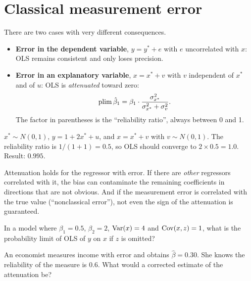 \section{Classical measurement error}
There are two cases with very different consequences.
\begin{itemize}[leftmargin=1.4em]
\item \textbf{Error in the dependent variable}, $y=y^*+e$ with $e$ uncorrelated with $x$: OLS remains consistent and only loses precision.
\item \textbf{Error in an explanatory variable}, $x=x^*+v$ with $v$ independent of $x^*$ and of $u$: OLS is \emph{attenuated} toward zero:
\[
\operatorname{plim}\hat\beta_1=\beta_1\cdot\frac{\sigma^2_{x^*}}{\sigma^2_{x^*}+\sigma^2_v}.
\]
The factor in parentheses is the ``reliability ratio'', always between 0 and 1.
\end{itemize}

\begin{simulacao}
$x^*\sim N(0,1)$, $y=1+2x^*+u$, and $x=x^*+v$ with $v\sim N(0,1)$. The reliability ratio is $1/(1+1)=0.5$, so OLS should converge to $2\times0.5=1.0$. Result: $0.995$.
\end{simulacao}

\begin{atencao}
Attenuation holds for the regressor with error. If there are \emph{other} regressors correlated with it, the bias can contaminate the remaining coefficients in directions that are not obvious. And if the measurement error is correlated with the true value (``nonclassical error''), not even the sign of the attenuation is guaranteed.
\end{atencao}

\begin{exercicio}
In a model where $\beta_1=0.5$, $\beta_2=2$, $\operatorname{Var}(x)=4$ and $\operatorname{Cov}(x,z)=1$, what is the probability limit of OLS of $y$ on $x$ if $z$ is omitted?
\end{exercicio}

\begin{exercicio}
An economist measures income with error and obtains $\hat\beta=0.30$. She knows the reliability of the measure is $0.6$. What would a corrected estimate of the attenuation be?
\end{exercicio}

